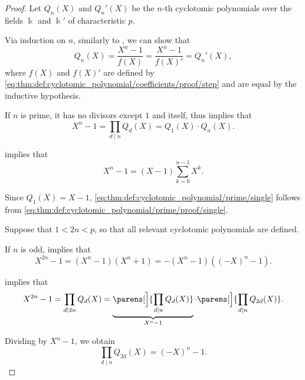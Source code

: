 \begin{proof}
   Let \( Q_n(X) \) and \( Q_n'(X) \) be the \( n \)-th cyclotomic polynomials over the fields \( \Bbbk \) and \( \Bbbk' \) of characteristic \( p \).

  Via induction on \( n \), similarly to , we can show that
  \begin{equation*}
    Q_n(X) = \frac {X^n - 1} {f(X)} = \frac {X^n - 1} {f(X)'} = Q_n'(X),
  \end{equation*}
  where \( f(X) \) and \( f(X)' \) are defined by \eqref{eq:thm:def:cyclotomic_polynomial/coefficients/proof/step} and are equal by the inductive hypothesis.

   If \( n \) is prime, it has no divisors except \( 1 \) and itself, thus  implies that
  \begin{equation*}
    X^n - 1 = \prod_{d \mid n} Q_d(X) = Q_1(X) \cdot Q_n(X).
  \end{equation*}

   implies that
  \begin{equation}\label{eq:thm:def:cyclotomic_polynomial/prime/proof}
    X^n - 1 = (X - 1) \sum_{k=0}^{n-1} X^k.
  \end{equation}

  Since \( Q_1(X) = X - 1 \), \eqref{eq:thm:def:cyclotomic_polynomial/prime/single} follows from \eqref{eq:thm:def:cyclotomic_polynomial/prime/proof/single}.

   Suppose that \( 1 < 2n < p \), so that all relevant cyclotomic polynomials are defined.

  If \( n \) is odd,  implies that
  \begin{equation*}
    X^{2n} - 1 = (X^n - 1) (X^n + 1) = -(X^n - 1) ((-X)^n - 1).
  \end{equation*}

   implies that
  \begin{equation*}
    X^{2n} - 1 = \prod_{d \mid 2n} Q_d(X) = \underbrace{\parens[\Big]{ \prod_{d \mid n} Q_d(X) }}_{X^n - 1} \cdot \parens[\Big]{ \prod_{d \mid n} Q_{2d}(X) }.
  \end{equation*}

  Dividing by \( X^n - 1 \), we obtain
  \begin{equation}\label{eq:thm:def:cyclotomic_polynomial/odd/proof/recurrence}
    \prod_{d \mid n} Q_{2d}(X) = (-X)^n - 1.
  \end{equation}


\end{proof}
